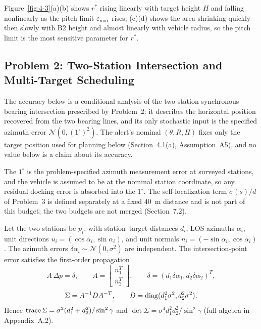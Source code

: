 Figure~\ref{fig:4-3}(a)(b) shows $r^*$ rising linearly with target height $H$ and falling nonlinearly as the pitch limit $\varepsilon_{\max}$ rises; (c)(d) shows the area shrinking quickly then slowly with B2 height and almost linearly with vehicle radius, so the pitch limit is the most sensitive parameter for $r^*$.


\subsection{Problem 2: Two-Station Intersection and Multi-Target Scheduling}
\label{sec:q2}

The accuracy below is a conditional analysis of the two-station synchronous bearing intersection prescribed by Problem~2: it describes the horizontal position recovered from the two bearing lines, and its only stochastic input is the specified azimuth error $\mathcal{N}(0,(1^\circ)^2)$. The alert's nominal $(\theta,R,H)$ fixes only the target position used for planning below (Section~4.1(a), Assumption~A5), and no value below is a claim about its accuracy.

The $1^\circ$ is the problem-specified azimuth measurement error at surveyed stations, and the vehicle is assumed to be at the nominal station coordinate, so any residual docking error is absorbed into the $1^\circ$. The self-localization term $\sigma(s)/d$ of Problem~3 is defined separately at a fixed $40$~m distance and is not part of this budget; the two budgets are not merged (Section~7.2).

Let the two stations be $p_i$, with station--target distances $d_i$, LOS azimuths $\alpha_i$, unit directions $u_i=(\cos\alpha_i,\sin\alpha_i)$, and unit normals $n_i=(-\sin\alpha_i,\cos\alpha_i)$. The azimuth errors $\delta\alpha_i\sim\mathcal{N}(0,\sigma^2)$ are independent. The intersection-point error satisfies the first-order propagation \cite{torrieri,foy}
\begin{equation}
  A\,\Delta p=\delta,\qquad A=\begin{bmatrix}n_1^T\\ n_2^T\end{bmatrix},\qquad
  \delta=(d_1\delta\alpha_1,d_2\delta\alpha_2)^T,
\end{equation}
\begin{equation}
  \Sigma=A^{-1}DA^{-T},\qquad D=\operatorname{diag}(d_1^2\sigma^2,d_2^2\sigma^2).
\end{equation}
Hence $\operatorname{trace}\Sigma=\sigma^2(d_1^2+d_2^2)/\sin^2\gamma$ and $\det\Sigma=\sigma^4d_1^2d_2^2/\sin^2\gamma$ (full algebra in Appendix~A.2).

